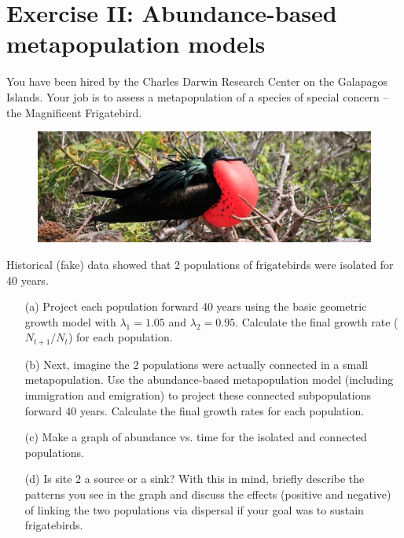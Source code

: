 \documentclass[12pt]{article}\usepackage[]{graphicx}\usepackage[]{color}
\begin{document}
\clearpage


\section*{Exercise II: Abundance-based metapopulation models }
You have been hired by the Charles Darwin Research Center on the
Galapagos Islands. Your job is to assess a metapopulation of a species
of special concern -- the Magnificent Frigatebird.

\begin{figure}[h!]
  \centering
  \includegraphics[width=\textwidth]{figs/frigatebird}
  \label{fig:frig}
\end{figure}

\vspace{-24pt}

Historical (fake) data showed that 2 populations of frigatebirds were
isolated for 40 years.

\begin{enumerate}
  \item[(a)] Project each population forward 40 years using the basic
    geometric growth model with $\lambda_1=1.05$ and
    $\lambda_2=0.95$. Calculate the final growth rate ($N_{t+1}/N_t$)
    for each population.
  \item[(b)] Next, imagine the 2 populations were actually connected
    in a small metapopulation. Use the abundance-based metapopulation
    model (including immigration and emigration) to project these
    connected subpopulations forward 40 years. Calculate the final
    growth rates for each population.
  \item[(c)] Make a graph of abundance vs. time for the isolated and
    connected populations.
  \item[(d)] Is site 2 a source or a sink? With this in mind,
    briefly describe the patterns you see in the graph and discuss the
    effects (positive and negative) of linking the two populations via
    dispersal if your goal was to sustain frigatebirds.
\end{enumerate}
\end{document}
